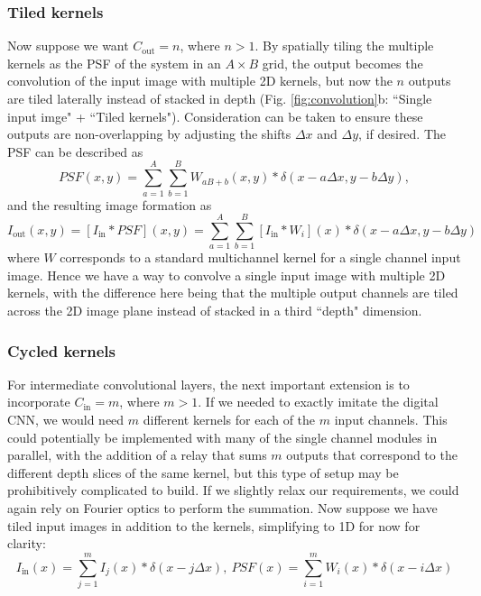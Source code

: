 \documentclass[fleqn,10pt]{wlscirep}
\begin{document}
\subsubsection*{Tiled kernels} Now suppose we want $C_\text{out} = n$, where $n >1$. By spatially tiling the multiple kernels as the PSF of the system in an $A \times B$ grid, the output becomes the convolution of the input image with multiple 2D kernels, but now the $n$ outputs are tiled laterally instead of stacked in depth (Fig. \ref{fig:convolution}b: ``Single input imge" + ``Tiled kernels"). Consideration can be taken to ensure these outputs are non-overlapping by adjusting the shifts $\Delta x$ and $\Delta y$, if desired. The PSF can be described as
\begin{equation}
{PSF}(x,y) = \sum_{a = 1}^{A}\sum_{b = 1}^{B} W_{aB+b} (x,y) * \delta(x - a\Delta x, y - b\Delta y),
\end{equation}
and the resulting image formation as
\begin{equation}
I_\text{out}(x,y) = [I_\text{in} * PSF](x,y) =\sum_{a = 1}^{A}\sum_{b = 1}^{B}  [I_\text{in} * W_i](x) * \delta(x - a\Delta x, y - b \Delta y)
\end{equation}
where $W$ corresponds to a standard multichannel kernel for a single channel input image. Hence we have a way to convolve a single input image with multiple 2D kernels, with the difference here being that the multiple output channels are tiled across the 2D image plane instead of stacked in a third ``depth" dimension.

\subsubsection*{Cycled kernels}
For intermediate convolutional layers, the next important extension is to incorporate $C_\text{in} = m$, where $m > 1$. If we needed to exactly imitate the digital CNN, we would need $m$ different kernels for each of the $m$ input channels. This could potentially be implemented with many of the single channel modules in parallel, with the addition of a relay that sums $m$ outputs that correspond to the different depth slices of the same kernel, but this type of setup may be prohibitively complicated to build. If we slightly relax our requirements, we could again rely on Fourier optics to perform the summation. Now suppose we have tiled input images in addition to the kernels, simplifying to 1D for now for clarity:
\begin{equation} I_\text{in}(x) = \sum_{j = 1}^m I_j(x)  * \delta(x - j\Delta x),\  PSF(x) = \sum_{i = 1}^m W_i(x)  * \delta(x - i\Delta x)\end{equation}
\end{document}
